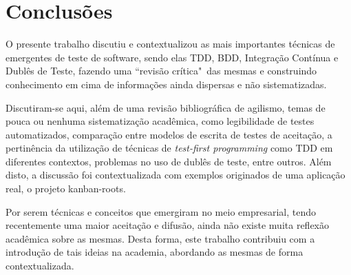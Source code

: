\chapter{Conclusões} %
\label{cha:conclusoes}

O presente trabalho discutiu e contextualizou as mais importantes técnicas de emergentes de teste de software, sendo elas TDD, BDD, Integração Contínua e Dublês de Teste, fazendo uma ``revisão crítica"\ das mesmas e construindo conhecimento em cima de informações ainda dispersas e não sistematizadas.

Discutiram-se aqui, além de uma revisão bibliográfica de agilismo, temas de pouca ou nenhuma sistematização acadêmica, como legibilidade de testes automatizados, comparação entre modelos de escrita de testes de aceitação, a pertinência da utilização de técnicas de \textit{test-first programming} como TDD em diferentes contextos, problemas no uso de dublês de teste, entre outros. Além disto, a discussão foi contextualizada com exemplos originados de uma aplicação real, o projeto kanban-roots.

Por serem técnicas e conceitos que emergiram no meio empresarial, tendo recentemente uma maior aceitação e difusão, ainda não existe muita reflexão acadêmica sobre as mesmas. Desta forma, este trabalho contribuiu com a introdução de tais ideias na academia, abordando as mesmas de forma contextualizada.

